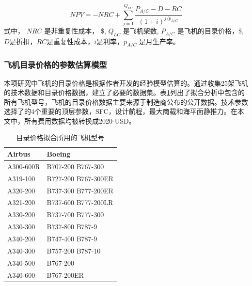\documentclass[12pt,a4paper]{report}
\begin{document}
\begin{equation}
\label{NPV}
NPV=-NRC+\sum_{j=1}^{Q_{LC}}\frac{P_{A/C}-D-RC}{(1+i)^{j/p_{A/C}}}
\end{equation}
式中， $NRC$ 是非重复性成本， \$, $Q_{LC}$ 是飞机架数, $P_{A/C}$ 是飞机的目录价格，\$, $D$是折扣，$RC$是重复性成本，$i$是利率，$p_{A/C}$ 是月生产率。

\subsubsection{飞机目录价格的参数估算模型}
本项研究中飞机的目录价格是根据作者开发的经验模型估算的。通过收集25架飞机的技术数据和目录价格数据，建立了必要的数据集。表\ref{tab:aircrafttype}列出了拟合分析中包含的所有飞机型号，飞机的目录价格数据主要来源于制造商公布的公开数据\cite{airbus,boeing}。技术参数选择了的4个重要的顶层参数，SFC，设计航程，最大商载和海平面静推力。在本文中，所有费用数据均被转换成2020-USD。
\begin{table}[hpt]
  \caption{目录价格拟合所用的飞机型号}
  \label{tab:aircrafttype}
  \centering
  \begin{tabular}{p{5cm}| p{6cm}} 
  \hline \hline
  Airbus & Boeing\\ \hline
  A300-600R	& B707-200 \hspace{1cm} B767-300\\ 
  A319-100	& B727-200 \hspace{1cm} B767-300ER\\ 
  A320-200 & B737-300 \hspace{1cm} B777-200ER\\ 
  A321-200 & B737-600 \hspace{1cm} B777-200LR\\ 
  A330-200 & B737-700 \hspace{1cm} B777-300\\ 
  A330-300 & B737-800 \hspace{1cm} B787-9\\ 
  A340-200 & B747-400 \hspace{1cm} B787-9\\ 
  A340-300 & B757-200 \hspace{1cm} B787-10\\ 
  A340-500 & B767-200 \\ 
  A340-600 & B767-200ER \\ \hline
  \hline
  \end{tabular}
\end{table}
\end{document}
